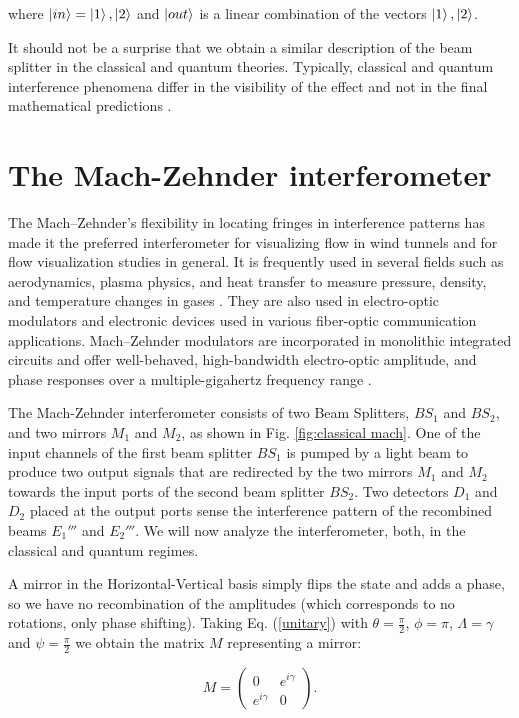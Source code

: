 \documentclass[12pt]{book}
\newcommand\blankpage{
    \null
    \thispagestyle{empty}
    \addtocounter{page}{0}
    \newpage
    }
\begin{document}
where $\ket{in}=\ket{1},\ket{2}$ and $\ket{out}$ is a linear combination of the vectors $\ket{1},\ket{2}$.

 It should not be a surprise that we obtain a similar description of the beam splitter in the classical and quantum theories. Typically, classical and quantum interference phenomena differ in the visibility of the effect and not in the final mathematical predictions \cite{leonhardt}.

\pagebreak
\blankpage
\chapter{The Mach-Zehnder interferometer }


 The Mach–Zehnder's flexibility in locating fringes in interference patterns has made it the preferred interferometer for visualizing flow in wind tunnels \cite{10} and for flow visualization studies in general. It is frequently used in several fields such as aerodynamics, plasma physics, and heat transfer to measure pressure, density, and temperature changes in gases \cite{11}. They are also used in electro-optic modulators \cite{ackerman} and electronic devices used in various fiber-optic communication applications. Mach–Zehnder modulators are incorporated in monolithic integrated circuits and offer well-behaved, high-bandwidth electro-optic amplitude, and phase responses over a multiple-gigahertz frequency range \cite{studenkov,capmany}.

The Mach-Zehnder interferometer consists of two Beam Splitters, $BS_{1}$ and $BS_{2}$, and two mirrors $M_{1}$ and $M_{2}$, as shown in Fig. \ref{fig:classical mach}. One of the input channels of the first beam splitter $BS_{1}$ is pumped by a light beam to produce two output signals that are redirected by the two mirrors $M_{1}$ and $M_{2}$ towards the input ports of the second beam splitter $BS_{2}$.  Two detectors $D_{1}$ and $D_{2}$ placed at the output ports sense the interference pattern of the recombined beams $E_{1}'''$ and $E_{2}'''$. We will now analyze the interferometer, both, in the classical and quantum regimes.


 A mirror in the Horizontal-Vertical basis simply flips the state and adds a phase, so we have no recombination of the amplitudes (which corresponds to no rotations, only phase shifting). Taking Eq. (\ref{unitary}) with $\theta=\frac{\pi}{2}$, $\phi=\pi$, $\Lambda=\gamma$ and $\psi= \frac{\pi}{2} $ we obtain the matrix $M$ representing a mirror:

 
\begin{equation}
M=\begin{pmatrix} 0& e^{i\gamma}  \\ e^{i\gamma} & 0 \end{pmatrix}. \label{mirror}
\end{equation}
\end{document}
